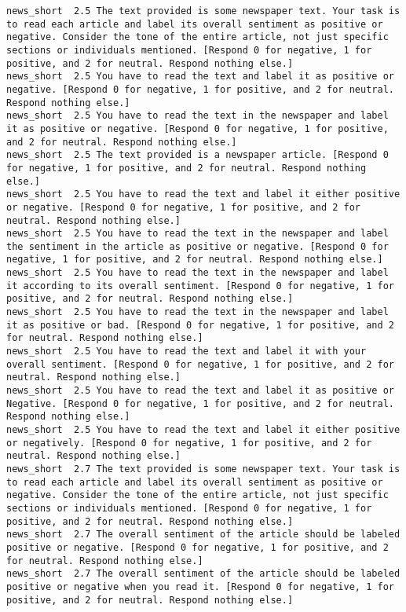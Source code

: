 \begin{lstlisting}[label=lst:promptvariants]
news_short	2.5	The text provided is some newspaper text. Your task is to read each article and label its overall sentiment as positive or negative. Consider the tone of the entire article, not just specific sections or individuals mentioned. [Respond 0 for negative, 1 for positive, and 2 for neutral. Respond nothing else.]
news_short	2.5	You have to read the text and label it as positive or negative. [Respond 0 for negative, 1 for positive, and 2 for neutral. Respond nothing else.]
news_short	2.5	You have to read the text in the newspaper and label it as positive or negative. [Respond 0 for negative, 1 for positive, and 2 for neutral. Respond nothing else.]
news_short	2.5	The text provided is a newspaper article. [Respond 0 for negative, 1 for positive, and 2 for neutral. Respond nothing else.]
news_short	2.5	You have to read the text and label it either positive or negative. [Respond 0 for negative, 1 for positive, and 2 for neutral. Respond nothing else.]
news_short	2.5	You have to read the text in the newspaper and label the sentiment in the article as positive or negative. [Respond 0 for negative, 1 for positive, and 2 for neutral. Respond nothing else.]
news_short	2.5	You have to read the text in the newspaper and label it according to its overall sentiment. [Respond 0 for negative, 1 for positive, and 2 for neutral. Respond nothing else.]
news_short	2.5	You have to read the text in the newspaper and label it as positive or bad. [Respond 0 for negative, 1 for positive, and 2 for neutral. Respond nothing else.]
news_short	2.5	You have to read the text and label it with your overall sentiment. [Respond 0 for negative, 1 for positive, and 2 for neutral. Respond nothing else.]
news_short	2.5	You have to read the text and label it as positive or Negative. [Respond 0 for negative, 1 for positive, and 2 for neutral. Respond nothing else.]
news_short	2.5	You have to read the text and label it either positive or negatively. [Respond 0 for negative, 1 for positive, and 2 for neutral. Respond nothing else.]
news_short	2.7	The text provided is some newspaper text. Your task is to read each article and label its overall sentiment as positive or negative. Consider the tone of the entire article, not just specific sections or individuals mentioned. [Respond 0 for negative, 1 for positive, and 2 for neutral. Respond nothing else.]
news_short	2.7	The overall sentiment of the article should be labeled positive or negative. [Respond 0 for negative, 1 for positive, and 2 for neutral. Respond nothing else.]
news_short	2.7	The overall sentiment of the article should be labeled positive or negative when you read it. [Respond 0 for negative, 1 for positive, and 2 for neutral. Respond nothing else.]

\end{lstlisting}
